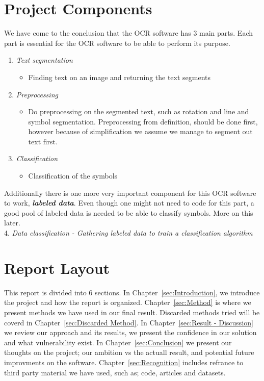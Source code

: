 \documentclass[11pt,a4paper,UKenglish]{report}
\begin{document}
\section{Project Components}
We have come to the conclusion that the OCR software has 3 main parts. Each
part is essential for the OCR software to be able to perform its purpose.
\begin{enumerate}
 \item{\textit{Text segmentation}}
 \begin{itemize}
  \item{Finding text on an image and returning the text segments}
 \end{itemize}
 \item{\textit{Preprocessing}}
 \begin{itemize}
  \item{Do preprocessing on the segmented text, such as rotation and line and
  symbol segmentation. Preprocessing from definition, should be done first,
  however because of simplification we assume we manage to segment out text
  first.}
 \end{itemize}
 \item{\textit{Classification}}
 \begin{itemize}
  \item{Classification of the symbols}
 \end{itemize}
\end{enumerate}

\begin{flushleft}
  Additionally there is one more very important component for this
  OCR software to work, \textit{\textbf{labeled data}}. Even though one might not
  need to code for this part, a good pool of labeled data is needed to be able to
  classify symbols. More on this later. \\
  4. \textit{Data classification - Gathering labeled data to train a classification algorithm}
\end{flushleft}


\section{Report Layout}
\label{subsec:Report Layout}
This report is divided into 6 sections. In
Chapter~\ref{sec:Introduction}, we introduce the project and how the report
is organized. Chapter~\ref{sec:Method} is where we present methods we have
used in our final result. Discarded methods tried will be coverd in Chapter~\ref{sec:Discarded Method}.
In Chapter~\ref{sec:Result - Discussion} we review our approach and
its results, we present the confidence in our solution and what vulnerability
exist. In Chapter~\ref{sec:Conclusion} we present our thoughts on the project;
our ambition vs the actuall result, and potential future improvments on the
software. Chapter~\ref{sec:Recognition} includes refrance to third party
material we have used, such as; code, articles and datasets.
\end{document}
